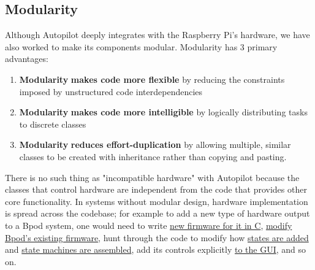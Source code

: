 \documentclass[nohyper, justified, notitlepage, marginals=raggedright,twoside=false,debug]{tufte-autopilot}
\begin{document}
\subsection{Modularity}

Although Autopilot deeply integrates with the Raspberry Pi's hardware, we have also worked to make its components modular. Modularity has 3 primary advantages:
\begin{enumerate}
    \item \textbf{Modularity} \textbf{makes code more flexible} by reducing the constraints imposed by unstructured code interdependencies
    \item \textbf{Modularity} \textbf{makes code more intelligible} by logically distributing tasks to discrete classes
    \item \textbf{Modularity} \textbf{reduces effort-duplication} by allowing multiple, similar classes to be created with inheritance rather than copying and pasting.
\end{enumerate}

There is no such thing as "incompatible hardware" with Autopilot because the classes that control hardware are independent from the code that provides other core functionality. In systems without modular design, hardware implementation is spread across the codebase; for example to add a new type of hardware output to a Bpod system, one would need to write \href{https://github.com/sanworks/Bpod_Gen2/blob/master/FIRMWARE\%20README.txt}{new firmware for it in C}, \href{https://github.com/sanworks/Bpod_StateMachine_Firmware/blob/v22/Preconfigured/StateMachine-Bpod2_0/StateMachine-Bpod2_0.ino}{modify Bpod's existing firmware}, hunt through the code to modify how \href{https://github.com/sanworks/Bpod_Gen2/blob/71f3a256b68926b65eae71e10fd747bd28e7ba7d/Functions/State\%20Machine\%20Assembler/AddState.m#L170}{states are added} and \href{https://github.com/sanworks/Bpod_Gen2/blob/71f3a256b68926b65eae71e10fd747bd28e7ba7d/Functions/\%40BpodObject/SetupStateMachine.m#L123}{state machines are assembled}, add its controls explicitly \href{https://github.com/sanworks/Bpod_Gen2/blob/71f3a256b68926b65eae71e10fd747bd28e7ba7d/Functions/Override\%20Panels/StateMachinePanel_2_0_0.m}{to the GUI}, and so on. 
\end{document}
